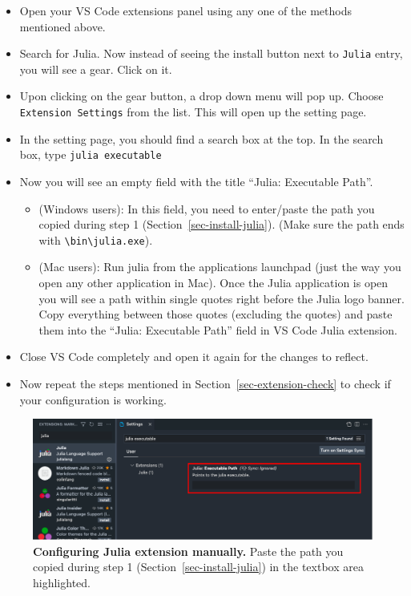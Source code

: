 \documentclass[
  letterpaper,
]{book}
\providecommand{\tightlist}{%
  \setlength{\itemsep}{0pt}\setlength{\parskip}{0pt}}\usepackage{longtable,booktabs,array}
\begin{document}
\begin{itemize}
\tightlist
\item
  Open your VS Code extensions panel using any one of the methods
  mentioned above.
\item
  Search for Julia. Now instead of seeing the install button next to
  \texttt{Julia} entry, you will see a gear. Click on it.
\item
  Upon clicking on the gear button, a drop down menu will pop up. Choose
  \texttt{Extension\ Settings} from the list. This will open up the
  setting page.
\item
  In the setting page, you should find a search box at the top. In the
  search box, type \texttt{julia\ executable}
\item
  Now you will see an empty field with the title ``Julia: Executable
  Path''.

  \begin{itemize}
  \tightlist
  \item
    (Windows users): In this field, you need to enter/paste the path you
    copied during step 1 (Section~\ref{sec-install-julia}). (Make sure
    the path ends with
    \texttt{\textbackslash{}bin\textbackslash{}julia.exe}).
  \item
    (Mac users): Run julia from the applications launchpad (just the way
    you open any other application in Mac). Once the Julia application
    is open you will see a path within single quotes right before the
    Julia logo banner. Copy everything between those quotes (excluding
    the quotes) and paste them into the ``Julia: Executable Path'' field
    in VS Code Julia extension.\\
  \end{itemize}
\item
  Close VS Code completely and open it again for the changes to reflect.
\item
  Now repeat the steps mentioned in Section~\ref{sec-extension-check} to
  check if your configuration is working.
\end{itemize}

\begin{figure}

{\centering \includegraphics{./images/fix-julia-ext2.png}

}

\caption{\label{fig-ext-fix}\textbf{Configuring Julia extension
manually.} Paste the path you copied during step 1
(Section~\ref{sec-install-julia}) in the textbox area highlighted.}

\end{figure}
\end{document}
